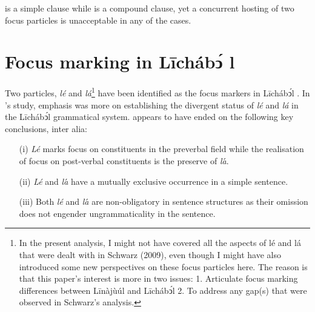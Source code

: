 \documentclass[output=paper,colorlinks,citecolor=brown]{langscibook}
\begin{document}
\ea%
    \label{ex:bisilki:21}
    \z
\z

 is a simple clause while  is a compound clause, yet a concurrent hosting of two focus particles is unacceptable in any of the cases.

\section{Focus marking in Līchábͻ́ l}\label{sec:bisilki:7}

Two particles,\textit{ lé} and \textit{lá}\footnote{In the present analysis, I might not have covered all the aspects of lé and lá that were dealt with in Schwarz (2009), even though I might have also introduced some new perspectives on these focus particles here. The reason is that this paper’s interest is more in two issues: 1. Articulate focus marking differences between Līnàjùúl and Līchábͻ́l 2. To address any gap(s) that were observed in Schwarz’s analysis.} have been identified as the focus markers in Līchábͻ́l \citep{Schwarz2009}. In \citeauthor{Schwarz2009}’s study, emphasis was more on establishing the divergent status of \textit{lé} and\textit{ lá } in the Līchábͻ́l grammatical system. \citeauthor{Schwarz2009} appears to have ended on the following key conclusions, inter alia:

\begin{itemize}
    \item[(i)]  \textit{Lé }marks focus on constituents in the preverbal field while the realisation of focus on post-verbal constituents is the preserve of \textit{la}́.
    \item[(ii)] \textit{Lé} and \textit{la}́ have a mutually exclusive occurrence in a simple sentence.
    \item[(iii)] Both \textit{lé }and \textit{la}́ are non-obligatory in sentence structures as their omission does not engender ungrammaticality in the sentence.
\end{itemize}
\end{document}
